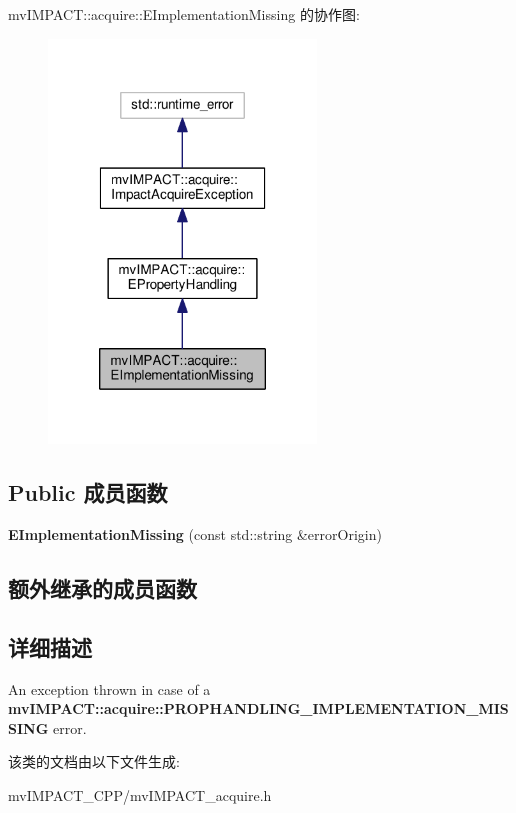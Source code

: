 mv\+I\+M\+P\+A\+C\+T\+:\+:acquire\+:\+:E\+Implementation\+Missing 的协作图\+:
\nopagebreak
\begin{figure}[H]
\begin{center}
\leavevmode
\includegraphics[width=202pt]{classmv_i_m_p_a_c_t_1_1acquire_1_1_e_implementation_missing__coll__graph}
\end{center}
\end{figure}
\subsection*{Public 成员函数}
\begin{DoxyCompactItemize}
\item 
\hypertarget{classmv_i_m_p_a_c_t_1_1acquire_1_1_e_implementation_missing_a2e051dc3eac442dd14aaa6977e25abdc}{{\bfseries E\+Implementation\+Missing} (const std\+::string \&error\+Origin)}\label{classmv_i_m_p_a_c_t_1_1acquire_1_1_e_implementation_missing_a2e051dc3eac442dd14aaa6977e25abdc}

\end{DoxyCompactItemize}
\subsection*{额外继承的成员函数}


\subsection{详细描述}
An exception thrown in case of a {\bfseries mv\+I\+M\+P\+A\+C\+T\+::acquire\+::\+P\+R\+O\+P\+H\+A\+N\+D\+L\+I\+N\+G\+\_\+\+I\+M\+P\+L\+E\+M\+E\+N\+T\+A\+T\+I\+O\+N\+\_\+\+M\+I\+S\+S\+I\+N\+G} error. 

该类的文档由以下文件生成\+:\begin{DoxyCompactItemize}
\item 
mv\+I\+M\+P\+A\+C\+T\+\_\+\+C\+P\+P/mv\+I\+M\+P\+A\+C\+T\+\_\+acquire.\+h\end{DoxyCompactItemize}
